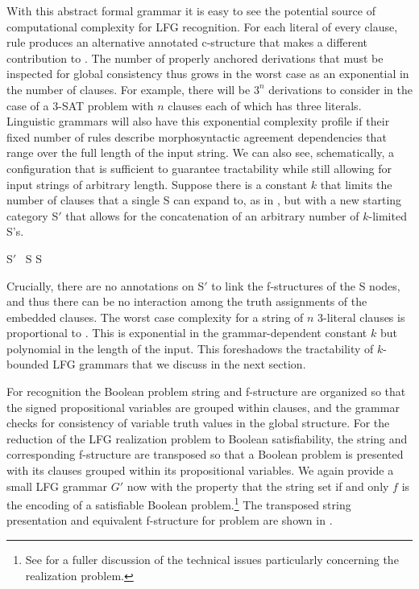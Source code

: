 \documentclass[output=paper,hidelinks]{langscibook}
\begin{document}
With this abstract formal grammar it is easy to see the potential source of computational complexity for LFG recognition. For each literal of every clause, rule  produces an alternative annotated c-structure that makes a different contribution to . The number of properly anchored derivations that must be inspected for global consistency thus grows in the worst case as an exponential in the number of clauses. For example, there will be $3^n$ derivations to consider in the case of a 3-SAT problem with $n$ clauses each of which has three literals. Linguistic grammars will also have this exponential complexity profile if their fixed number of rules describe morphosyntactic agreement dependencies that range over the full length of the input string. We can also see, schematically, a configuration that is sufficient to guarantee tractability while still allowing for input strings of arbitrary length.  Suppose there is a constant $k$ that limits the number of clauses that a single S can expand to, as in , but with a new starting category S$'$ that allows for the concatenation of an arbitrary number of $k$-limited S's.

\ea\label{boundedrecognition}\small
 S$'$ \rarrow \ S\kplus \hsp{3em} S \rarrow \hsp{-1em} 
\z

\noindent Crucially, there are no annotations on S$'$ to link the f-structures of the S nodes, and thus there can be no interaction among the truth assignments of the embedded clauses. The worst case complexity for a string of $n$ 3-literal clauses is proportional to . This is exponential in the grammar-dependent constant $k$ but polynomial in the length of the input. This foreshadows the tractability of $k$-bounded  LFG grammars that we discuss in the next section.

For recognition the Boolean problem string and f-structure are organized so that the signed propositional variables are grouped within clauses, and the grammar checks for consistency of variable truth values in the global  structure.  For the reduction of the LFG realization problem to Boolean satisfiability, the string and corresponding f-structure are transposed so that a Boolean problem is presented with its clauses grouped within its propositional variables.  We again provide a small LFG grammar $G'$ now with the property that the string set  if and only $f$ is the encoding of a satisfiable Boolean problem.\footnote{See \citet{WedekindKaplan2021} for a fuller discussion of the technical issues particularly concerning the realization problem.}  The transposed string presentation and equivalent f-structure for problem  are shown in .
\end{document}
